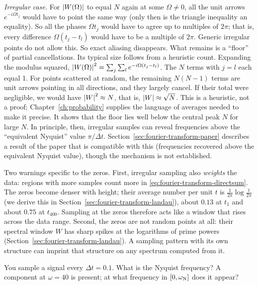 \emph{Irregular case.} For $\left\lvert W(\Omega)\right\rvert$ to equal $N$ again at some $\Omega\ne0$, all the unit arrows $e^{-i\Omega t_j}$ would have to point the same way (only then is the triangle inequality an equality). So all the phases $\Omega t_j$ would have to agree up to multiples of $2\pi$; that is, every difference $\Omega(t_j-t_l)$ would have to be a multiple of $2\pi$. Generic irregular points do not allow this. So exact aliasing disappears. What remains is a ``floor'' of partial cancellations. Its typical size follows from a heuristic count. Expanding the modulus squared, $\left\lvert W(\Omega)\right\rvert^2=\sum_j\sum_l e^{-i\Omega(t_j-t_l)}$. The $N$ terms with $j=l$ each equal 1. For points scattered at random, the remaining $N(N-1)$ terms are unit arrows pointing in all directions, and they largely cancel. If their total were negligible, we would have $\left\lvert W\right\rvert^2\approx N$, that is, $\left\lvert W\right\rvert\approx\sqrt N$. This is a heuristic, not a proof; Chapter~\ref{ch:probability} supplies the language of averages needed to make it precise. It shows that the floor lies well below the central peak $N$ for large $N$. In principle, then, irregular samples can reveal frequencies above the ``equivalent Nyquist'' value $\pi/\overline{\Delta t}$. Section~\ref{sec:fourier-transform-paper} describes a result of the paper that is compatible with this (frequencies recovered above the equivalent Nyquist value), though the mechanism is not established.

Two warnings specific to the zeros. First, irregular sampling also \emph{weights} the data: regions with more samples count more in \eqref{eq:fourier-transform-directsum}. The zeros become denser with height; their average number per unit $t$ is $\frac{1}{2\pi}\log\frac{t}{2\pi}$ (we derive this in Section~\ref{sec:fourier-transform-landau}), about $0.13$ at $t_1$ and about $0.75$ at $t_{400}$. Sampling at the zeros therefore acts like a window that rises across the data range. Second, the zeros are not random points at all: their spectral window $W$ has sharp spikes at the logarithms of prime powers (Section~\ref{sec:fourier-transform-landau}). A sampling pattern with its own structure can imprint that structure on any spectrum computed from it.

\begin{checkpoint}
You sample a signal every $\Delta t=0.1$. What is the Nyquist frequency? A component at $\omega=40$ is present; at what frequency in $[0,\omega_{\rm N}]$ does it appear?
\end{checkpoint}


